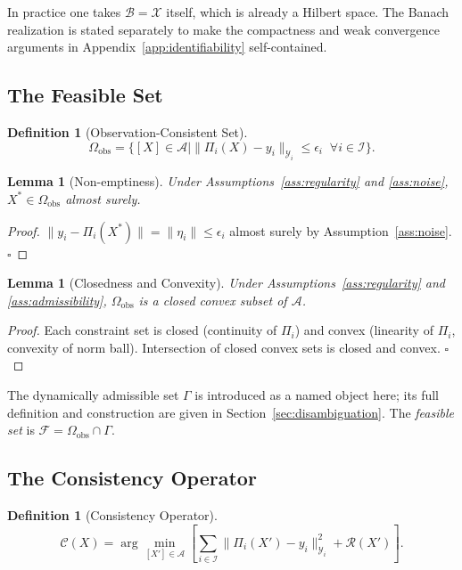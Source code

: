 \documentclass[12pt, oneside]{article}
\newtheorem{lemma}[theorem]{Lemma}
\newtheorem{definition}[theorem]{Definition}
\begin{document}
In practice one takes $\mathcal{B} = \mathcal{X}$ itself, which is already a Hilbert
space. The Banach realization is stated separately to make the compactness and weak
convergence arguments in Appendix~\ref{app:identifiability} self-contained.

\subsection{The Feasible Set}

\begin{definition}[Observation-Consistent Set]
\[
\Omega_{\mathrm{obs}} = \{ [X] \in \mathcal{A} \mid
\|\Pi_i(X) - y_i\|_{\mathcal{Y}_i} \le \epsilon_i \;\; \forall i \in \mathcal{I} \}.
\]
\end{definition}

\begin{lemma}[Non-emptiness]
Under Assumptions~\ref{ass:regularity} and \ref{ass:noise}, $X^* \in \Omega_{\mathrm{obs}}$
almost surely.
\end{lemma}
\begin{proof}
$\|y_i - \Pi_i(X^*)\| = \|\eta_i\| \le \epsilon_i$ almost surely by Assumption~\ref{ass:noise}.
$\square$
\end{proof}

\begin{lemma}[Closedness and Convexity]
Under Assumptions~\ref{ass:regularity} and \ref{ass:admissibility},
$\Omega_{\mathrm{obs}}$ is a closed convex subset of $\mathcal{A}$.
\end{lemma}
\begin{proof}
Each constraint set is closed (continuity of $\Pi_i$) and convex (linearity of $\Pi_i$,
convexity of norm ball). Intersection of closed convex sets is closed and convex.
$\square$
\end{proof}

The dynamically admissible set $\Gamma$ is introduced as a named object here; its full
definition and construction are given in Section~\ref{sec:disambiguation}. The
\emph{feasible set} is $\mathcal{F} = \Omega_{\mathrm{obs}} \cap \Gamma$.

\subsection{The Consistency Operator}

\begin{definition}[Consistency Operator]
\[
\mathcal{C}(X) = \arg\min_{[X'] \in \mathcal{A}}
\left[ \sum_{i \in \mathcal{I}} \|\Pi_i(X') - y_i\|_{\mathcal{Y}_i}^2
+ \mathcal{R}(X') \right].
\]
\end{definition}
\end{document}
